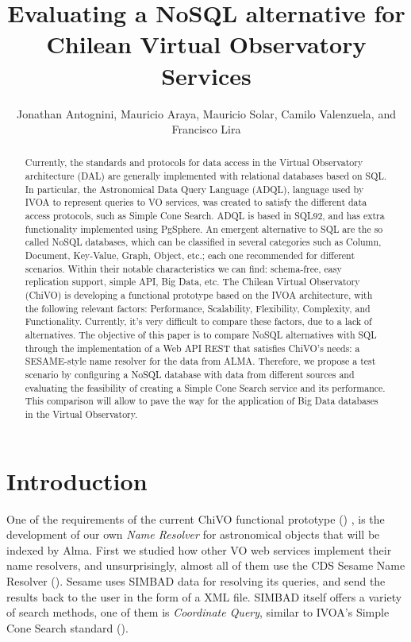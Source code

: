 \documentclass[11pt,twoside]{article}
\begin{document}
\title{Evaluating a NoSQL alternative for Chilean Virtual Observatory Services}
\author{Jonathan Antognini,  Mauricio Araya, Mauricio Solar, Camilo Valenzuela, and  Francisco Lira
}

\begin{abstract}
Currently, the standards and protocols for data access in the Virtual Observatory architecture (DAL) are generally implemented with
relational databases based on SQL. In particular, the Astronomical Data Query Language (ADQL), language used by IVOA to represent 
queries to VO services, was created to satisfy the different data access protocols, such as Simple Cone Search. ADQL is based in 
SQL92, and has extra functionality implemented using PgSphere. An emergent alternative to SQL are the so called NoSQL databases, 
which can be classified in several categories such as Column, Document, Key-Value, Graph, Object, etc.; each one recommended for 
different scenarios. Within their notable characteristics we can find: schema-free, easy replication support, simple API, Big Data,
etc. The Chilean Virtual Observatory (ChiVO) is developing a functional prototype based on the IVOA architecture, with the following
relevant factors: Performance, Scalability, Flexibility, Complexity, and Functionality. Currently, it's very difficult to compare 
these factors, due to a lack of alternatives. The objective of this paper is to compare NoSQL alternatives with SQL through the 
implementation of a Web API REST that satisfies ChiVO's needs: a SESAME-style name resolver for the data from ALMA. Therefore, 
we propose a test scenario by configuring a NoSQL database with data from different sources and evaluating the feasibility of 
creating a Simple Cone Search service and its performance. This comparison will allow to pave the way for the application of 
Big Data databases in the Virtual Observatory.
\end{abstract}

\section{Introduction}
One of the requirements of the current ChiVO functional prototype
(\cite{antognini2014chilean})
, is the development of our own \emph{Name Resolver}
for astronomical objects that will be indexed by Alma. 
First we studied how other VO web services implement their name 
resolvers, and unsurprisingly, almost all of them use the CDS Sesame Name
Resolver (\cite{wenger2000simbad}). 
Sesame uses SIMBAD data for resolving its queries, and send the results
back to the user in the form of a XML file.
SIMBAD itself offers a variety of search methods, one of them is
\emph{Coordinate Query}, similar to IVOA’s Simple Cone Search standard (\cite{williams2006ivoa}).
\end{document}
